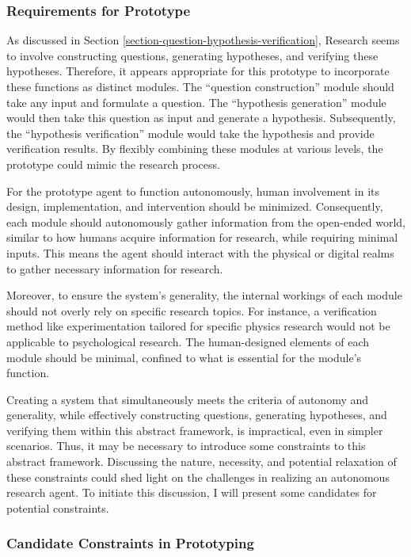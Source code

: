 \documentclass{article}
\begin{document}
\subsubsection{Requirements for Prototype}
As discussed in Section \ref{section-question-hypothesis-verification}, Research seems to involve constructing questions, generating hypotheses, and verifying these hypotheses. Therefore, it appears appropriate for this prototype to incorporate these functions as distinct modules. The ``question construction'' module should take any input and formulate a question. The ``hypothesis generation'' module would then take this question as input and generate a hypothesis. Subsequently, the ``hypothesis verification'' module would take the hypothesis and provide verification results. By flexibly combining these modules at various levels, the prototype could mimic the research process.

For the prototype agent to function autonomously, human involvement in its design, implementation, and intervention should be minimized. Consequently, each module should autonomously gather information from the open-ended world, similar to how humans acquire information for research, while requiring minimal inputs. This means the agent should interact with the physical or digital realms to gather necessary information for research.

Moreover, to ensure the system's generality, the internal workings of each module should not overly rely on specific research topics. For instance, a verification method like experimentation tailored for specific physics research would not be applicable to psychological research. The human-designed elements of each module should be minimal, confined to what is essential for the module's function.

Creating a system that simultaneously meets the criteria of autonomy and generality, while effectively constructing questions, generating hypotheses, and verifying them within this abstract framework, is impractical, even in simpler scenarios. Thus, it may be necessary to introduce some constraints to this abstract framework. Discussing the nature, necessity, and potential relaxation of these constraints could shed light on the challenges in realizing an autonomous research agent. To initiate this discussion, I will present some candidates for potential constraints.

\subsubsection{Candidate Constraints in Prototyping}
\end{document}
